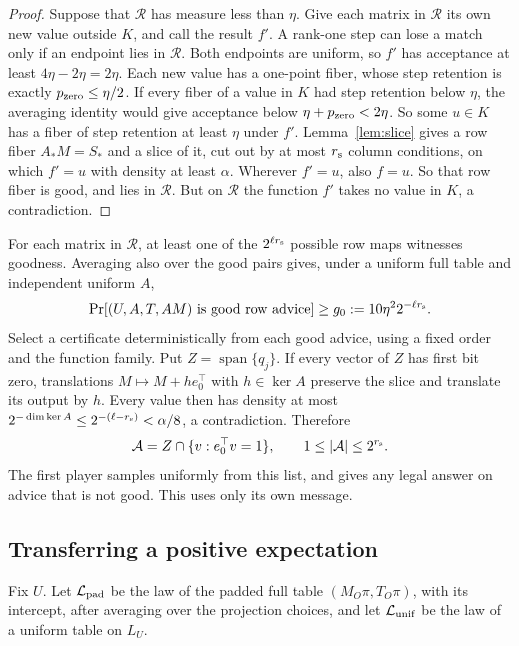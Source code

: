 \documentclass[11pt]{article}
\newcommand{\Span}{\operatorname{span}}
\begin{document}
\begin{proof}
Suppose that $\mathcal R$ has measure less than $\eta$. Give each matrix in
$\mathcal R$ its own new value outside $K$, and call the result $f'$.
A rank-one step can lose a match only if an endpoint lies in $\mathcal R$.
Both endpoints are uniform, so $f'$ has acceptance at least
$4\eta-2\eta=2\eta$. Each new value has a one-point fiber, whose step
retention is exactly $p_{\rm zero}\le\eta/2$. If every fiber of a value in $K$ had
step retention below $\eta$, the averaging identity would give acceptance
below $\eta+p_{\rm zero}<2\eta$. So some $u\in K$ has a fiber of step retention at
least $\eta$ under $f'$. Lemma~\ref{lem:slice} gives a row fiber
$A_*M=S_*$ and a slice of it, cut out by at most $r_{\rm s}$ column
conditions, on which $f'=u$ with density at least $\alpha$. Wherever
$f'=u$, also $f=u$. So that row fiber is good, and lies in $\mathcal R$.
But on $\mathcal R$ the function $f'$ takes no value in $K$, a
contradiction.
\end{proof}

For each matrix in $\mathcal R$, at least one of the $2^{\ell r_{\rm s}}$ possible row maps
witnesses goodness. Averaging also over the good pairs gives, under a
uniform full table and independent uniform $A$,
\begin{equation}\label{eq:g0}
 \Pr[(U,A,T,AM)\text{ is good row advice}]
 \ge g_0:=10\eta^2 2^{-\ell r_{\rm s}}.
\end{equation}
Select a certificate deterministically from each good advice, using a
fixed order and the function family. Put $Z=\Span\{q_j\}$. If every
vector of $Z$ has first bit zero, translations $M\mapsto M+h e_0^\top$
with $h\in\ker A$ preserve the slice and translate its output by $h$.
Every value then has density at most
$2^{-\dim\ker A}\le2^{-(\ell-r_{\rm s})}<\alpha/8$, a contradiction. Therefore
\begin{equation}\label{eq:answer-list}
 \mathcal A=Z\cap\{v:e_0^\top v=1\},\qquad 1\le|\mathcal A|\le2^{r_{\rm s}}.
\end{equation}
The first player samples uniformly from this list, and gives any legal
answer on advice that is not good. This uses only its own message.

\subsection{Transferring a positive expectation}

Fix $U$. Let $\mathcal L_{\rm pad}$ be the law of the padded full table
$(M_O\pi,T_O\pi)$, with its intercept, after averaging over the projection
choices, and let $\mathcal L_{\rm unif}$ be the law of a uniform table on
$L_U$.
\end{document}
